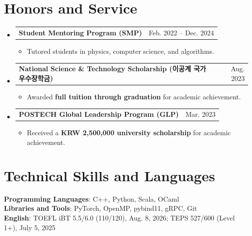 \documentclass[letterpaper,11pt]{article}
\makeatletter
\newcommand{\resumeItem}[1]{
  \item\small{
    {#1 \vspace{-2pt}}
  }
}
\newcommand{\resumeProjectHeading}[2]{
  \item
  \begin{tabular*}{0.97\textwidth}{l@{\extracolsep{\fill}}r}
    \small#1 & #2 \\
  \end{tabular*}\vspace{-7pt}
}
\newcommand{\resumeSubHeadingListStart}{\begin{itemize}[leftmargin=0.15in, label={}]}
\newcommand{\resumeSubHeadingListEnd}{\end{itemize}}
\newcommand{\resumeItemListStart}{\begin{itemize}}
\newcommand{\resumeItemListEnd}{\end{itemize}\vspace{-5pt}}
\makeatother
\begin{document}
\section{Honors and Service}
\resumeSubHeadingListStart
  \resumeProjectHeading
  {\textbf{Student Mentoring Program (SMP)}}{Feb. 2022 -- Dec. 2024}
  \resumeItemListStart
    \resumeItem{Tutored students in physics, computer science, and algorithms.}
  \resumeItemListEnd
  \resumeProjectHeading
  {\textbf{National Science \& Technology Scholarship (이공계 국가우수장학금)}}{Aug. 2023}
  \resumeItemListStart
    \resumeItem{Awarded \textbf{full tuition through graduation} for academic achievement.}
  \resumeItemListEnd
  \resumeProjectHeading
  {\textbf{POSTECH Global Leadership Program (GLP)}}{Mar. 2023}
  \resumeItemListStart
    \resumeItem{Received a \textbf{KRW 2,500,000 university scholarship} for academic achievement.}
  \resumeItemListEnd
\resumeSubHeadingListEnd

\section{Technical Skills and Languages}
\begin{itemize}[leftmargin=0.15in, label={}]
  \small{\item{
      \textbf{Programming Languages}{: C++, Python, Scala, OCaml} \\
      \textbf{Libraries and Tools}{: PyTorch, OpenMP, pybind11, gRPC, Git} \\
      \textbf{English}{: TOEFL iBT 5.5/6.0 (110/120), Aug. 8, 2026; TEPS 527/600 (Level 1+), July 5, 2025}
    }}
\end{itemize}
\end{document}
